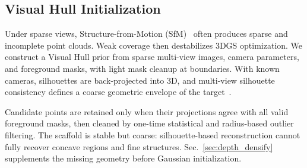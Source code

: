 \subsection{Visual Hull Initialization}
\label{sec:visual_hull}

Under sparse views, Structure-from-Motion (SfM)~\cite{Schonberger16_COLMAP} often produces sparse and incomplete point clouds. Weak coverage then destabilizes 3DGS optimization. We construct a Visual Hull prior from sparse multi-view images, camera parameters, and foreground masks, with light mask cleanup at boundaries. With known cameras, silhouettes are back-projected into 3D, and multi-view silhouette consistency defines a coarse geometric envelope of the target~\cite{Laurentini94_VisualHull}.

Candidate points are retained only when their projections agree with all valid foreground masks, then cleaned by one-time statistical and radius-based outlier filtering. The scaffold is stable but coarse: silhouette-based reconstruction cannot fully recover concave regions and fine structures. Sec.~\ref{sec:depth_densify} supplements the missing geometry before Gaussian initialization.
